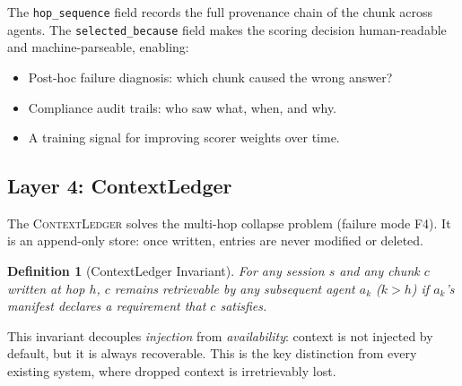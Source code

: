 \documentclass[11pt]{article}
\newtheorem{definition}{Definition}
\begin{document}
The \texttt{hop\_sequence} field records the full provenance chain of the
chunk across agents. The \texttt{selected\_because} field makes the scoring
decision human-readable and machine-parseable, enabling:

\begin{itemize}
  \item Post-hoc failure diagnosis: which chunk caused the wrong answer?
  \item Compliance audit trails: who saw what, when, and why.
  \item A training signal for improving scorer weights over time.
\end{itemize}

\subsection{Layer 4: ContextLedger}
\label{sec:ledger}

The \textsc{ContextLedger} solves the multi-hop collapse problem
(failure mode F4). It is an append-only store: once written, entries
are never modified or deleted.

\begin{definition}[ContextLedger Invariant]
  For any session $s$ and any chunk $c$ written at hop $h$, $c$ remains
  retrievable by any subsequent agent $a_k$ ($k > h$) if $a_k$'s manifest
  declares a requirement that $c$ satisfies.
\end{definition}

This invariant decouples \emph{injection} from \emph{availability}: context
is not injected by default, but it is always recoverable. This is the key
distinction from every existing system, where dropped context is irretrievably
lost.
\end{document}
